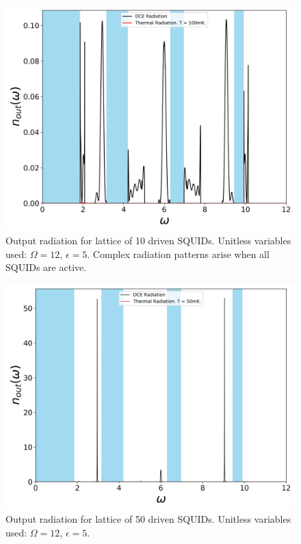 \begin{figure}[h]
    \centering
    \includegraphics[width=\textwidth, keepaspectratio]{figures/results/10_SQUIDs_active.png}
    \caption{Output radiation for lattice of 10 driven SQUIDs. Unitless variables used: $\Omega=12$, $\epsilon=5$. Complex radiation patterns arise when all SQUIDs are active.}
    \label{fig:10_SQUIDs_active}
\end{figure}
%
\begin{figure}[h]
    \centering
    \includegraphics[width=\textwidth, keepaspectratio]{figures/results/50_SQUIDs_active.png}
    \caption{Output radiation for lattice of 50 driven SQUIDs. Unitless variables used: $\Omega=12$, $\epsilon=5$.}
    \label{fig:50_SQUIDs_active}
\end{figure}
